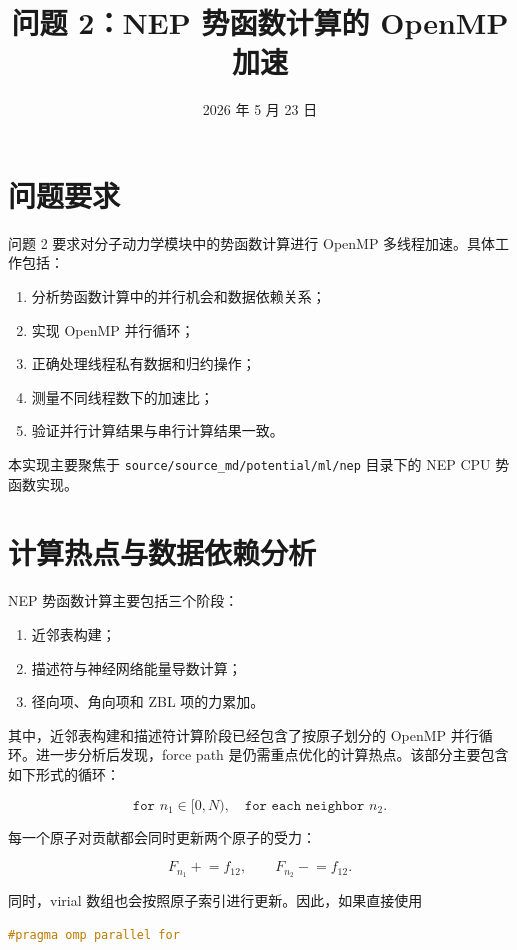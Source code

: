 \documentclass[11pt]{article}
\title{问题 2：NEP 势函数计算的 OpenMP 加速}
\author{}
\date{2026 年 5 月 23 日}
\begin{document}
\maketitle

\section{问题要求}

问题 2 要求对分子动力学模块中的势函数计算进行 OpenMP 多线程加速。具体工作包括：

\begin{enumerate}
  \item 分析势函数计算中的并行机会和数据依赖关系；
  \item 实现 OpenMP 并行循环；
  \item 正确处理线程私有数据和归约操作；
  \item 测量不同线程数下的加速比；
  \item 验证并行计算结果与串行计算结果一致。
\end{enumerate}

本实现主要聚焦于
\texttt{source/source\_md/potential/ml/nep}
目录下的 NEP CPU 势函数实现。

\section{计算热点与数据依赖分析}

NEP 势函数计算主要包括三个阶段：

\begin{enumerate}
  \item 近邻表构建；
  \item 描述符与神经网络能量导数计算；
  \item 径向项、角向项和 ZBL 项的力累加。
\end{enumerate}

其中，近邻表构建和描述符计算阶段已经包含了按原子划分的 OpenMP 并行循环。进一步分析后发现，force path 是仍需重点优化的计算热点。该部分主要包含如下形式的循环：

\[
  \texttt{for } n_1 \in [0,N), \quad
  \texttt{for each neighbor } n_2.
\]

每一个原子对贡献都会同时更新两个原子的受力：

\[
  F_{n_1} \mathrel{+}= f_{12}, \qquad
  F_{n_2} \mathrel{-}= f_{12}.
\]

同时，virial 数组也会按照原子索引进行更新。因此，如果直接使用

\begin{lstlisting}[language=C++]
#pragma omp parallel for
\end{lstlisting}
\end{document}
